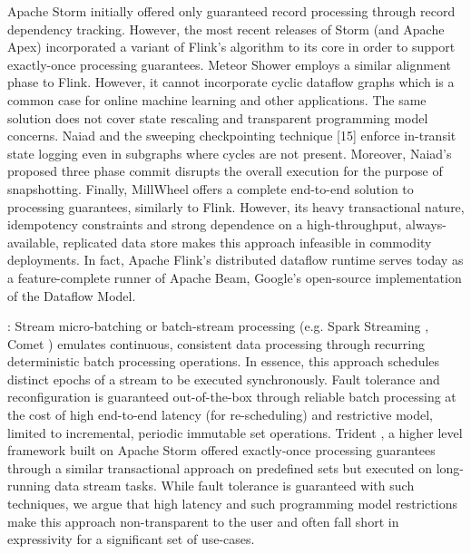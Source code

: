 Apache Storm \cite{CUSTOM:web/Storm} initially offered only guaranteed record processing through record dependency tracking. However, the most recent releases of Storm (and Apache Apex\cite{CUSTOM:web/apex}) incorporated a variant of Flink's algorithm to its core in order to support exactly-once processing guarantees. Meteor Shower \cite{wang2012meteor} employs a similar alignment phase to Flink. However, it cannot incorporate cyclic dataflow graphs which is a common case for online machine learning \cite{de2015samoa} and other applications. The same solution does not cover state rescaling and transparent programming model concerns. Naiad \cite{murray2013naiad} and the sweeping checkpointing technique [15] enforce in-transit state logging even in subgraphs where cycles are not present. Moreover, Naiad's proposed three phase commit disrupts the overall execution for the purpose of snapshotting. Finally, MillWheel \cite{millwheel} offers a complete end-to-end solution to processing guarantees, similarly to Flink. However, its heavy transactional nature, idempotency constraints and strong dependence on a high-throughput, always-available, replicated data store \cite{chang2008bigtable} makes this approach infeasible in commodity deployments. In fact, Apache Flink's distributed dataflow runtime serves today as a feature-complete runner of Apache Beam\cite{CUSTOM:web/beam}, Google's open-source implementation of the Dataflow Model\cite{CUSTOM:web/Dataflow}.
\vspace{5mm}


: Stream micro-batching or batch-stream processing (e.g. Spark Streaming \cite{zaharia2012discretized}, Comet \cite{he2010comet}) emulates continuous, consistent data processing through recurring deterministic batch processing operations. In essence, this approach schedules distinct epochs of a stream to be executed synchronously. Fault tolerance and reconfiguration is guaranteed out-of-the-box through reliable batch processing at the cost of high end-to-end latency (for re-scheduling) and restrictive model, limited to incremental, periodic immutable set operations. Trident \cite{CUSTOM:web/trident}, a higher level framework built on Apache Storm offered exactly-once processing guarantees through a similar transactional approach on predefined sets but executed on long-running data stream tasks. While fault tolerance is guaranteed with such techniques, we argue that high latency and such programming model restrictions make this approach non-transparent to the user and often fall short in expressivity for a significant set of use-cases.
